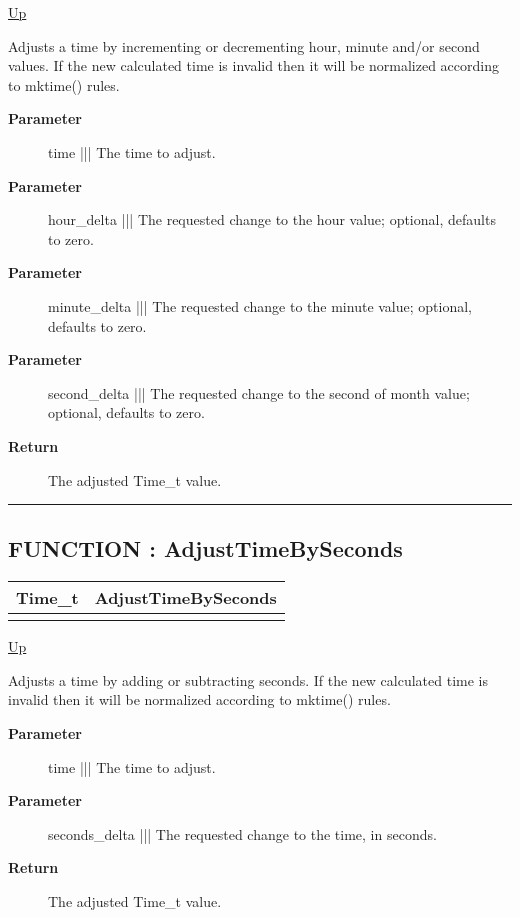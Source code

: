 \hyperlink{ecldoc:Date}{Up}

\par
Adjusts a time by incrementing or decrementing hour, minute and/or second values. If the new calculated time is invalid then it will be normalized according to mktime() rules.

\par
\begin{description}
\item [\textbf{Parameter}] time ||| The time to adjust.
\item [\textbf{Parameter}] hour\_delta ||| The requested change to the hour value; optional, defaults to zero.
\item [\textbf{Parameter}] minute\_delta ||| The requested change to the minute value; optional, defaults to zero.
\item [\textbf{Parameter}] second\_delta ||| The requested change to the second of month value; optional, defaults to zero.
\item [\textbf{Return}] The adjusted Time\_t value.
\end{description}

\rule{\textwidth}{0.4pt}
\subsection*{FUNCTION : AdjustTimeBySeconds}
\hypertarget{ecldoc:date.adjusttimebyseconds}{}

{\renewcommand{\arraystretch}{1.5}
\begin{tabularx}{\textwidth}{|>{\raggedright\arraybackslash}l|X|}
\hline
\hspace{0pt}Time\_t & AdjustTimeBySeconds \\
\hline
\multicolumn{2}{|>{\raggedright\arraybackslash}X|}{\hspace{0pt}(Time\_t time, INTEGER4 seconds\_delta)} \\
\hline
\end{tabularx}
}

\hyperlink{ecldoc:Date}{Up}

\par
Adjusts a time by adding or subtracting seconds. If the new calculated time is invalid then it will be normalized according to mktime() rules.

\par
\begin{description}
\item [\textbf{Parameter}] time ||| The time to adjust.
\item [\textbf{Parameter}] seconds\_delta ||| The requested change to the time, in seconds.
\item [\textbf{Return}] The adjusted Time\_t value.
\end{description}

